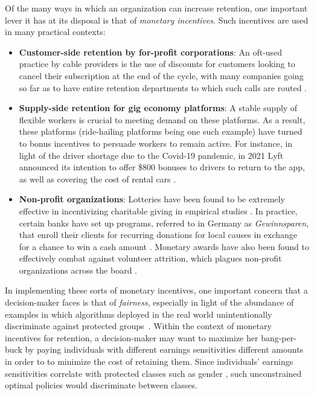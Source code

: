 \documentclass[12pt]{article}
\begin{document}
Of the many ways in which an organization can increase retention, one important lever it has at its disposal is that of {\it monetary incentives}. {Such incentives are used in many practical contexts:}
\begin{itemize}
    \item \textbf{Customer-side retention by for-profit corporations}: An oft-used practice by cable providers is the use of discounts for customers looking to cancel their subscription at the end of the cycle, with many companies going so far as to have entire retention departments to which such calls are routed \cite{cable_discounts,cable_discounts_2,cable_discounts_3}.
    \item \textbf{Supply-side retention for gig economy platforms}: A stable supply of flexible workers is crucial to meeting demand on these platforms. As a result, these platforms (ride-hailing platforms being one such example) have turned to bonus incentives to persuade workers to remain active. For instance, in light of the driver shortage due to the Covid-19 pandemic, in 2021 Lyft announced its intention to offer \$800 bonuses to drivers to return to the app, as well as covering the cost of rental cars \cite{lyft_bonuses}.
    \item \textbf{Non-profit organizations}: Lotteries have been found to be extremely effective in incentivizing charitable giving in empirical studies \cite{landry2006toward}. In practice, certain banks have set up programs, referred to in Germany as \emph{Gewinnsparen}, that enroll their clients for recurring donations for local causes in exchange for a chance to win a cash amount \cite{gewinnsparen}. Monetary awards have also been found to effectively combat against volunteer attrition, which plagues non-profit organizations across the board \cite{downs2014modeling,frey2017volunteer}.
\end{itemize}



In implementing these sorts of monetary incentives, one important concern that a decision-maker faces is that of {\it fairness}, especially in light of the abundance of examples in which algorithms deployed in the real world unintentionally discriminate against protected groups~\cite{kleinberg2018algorithmic}. %
Within the context of monetary incentives for retention, %
a decision-maker may want  %
to maximize her bang-per-buck by paying individuals with different earnings sensitivities different amounts in order to to minimize the cost of retaining them. %
Since individuals' earnings sensitivities correlate with protected classes such as gender \cite{heckert2002gender}, such unconstrained optimal policies would discriminate between classes.
\end{document}
